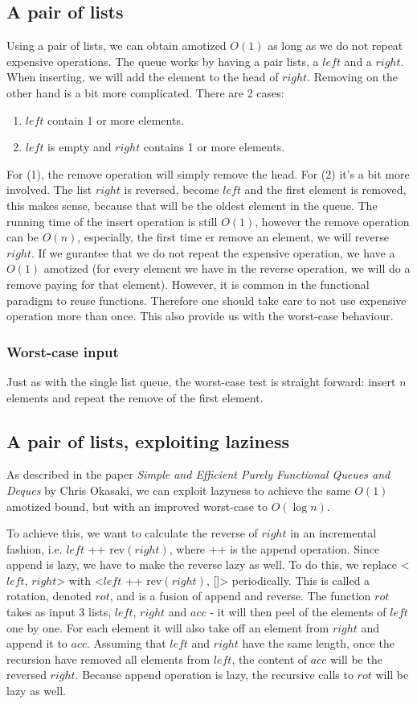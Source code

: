 \subsection*{A pair of lists}
Using a pair of lists, we can obtain amotized $O(1)$ as long as we do not repeat expensive operations. The queue works by having a pair lists, a $left$ and a $right$. When inserting, we will add the element to the head of $right$. Removing on the other hand is a bit more complicated. There are 2 cases:
\begin{enumerate}
	\item $left$ contain 1 or more elements.
	\item $left$ is empty and $right$ contains 1 or more elements.
\end{enumerate}
For (1), the remove operation will simply remove the head. For (2) it's a bit more involved. The list $right$ is reversed, become $left$ and the first element is removed, this makes sense, because that will be the oldest element in the queue. The running time of the insert operation is still $O(1)$, however the remove operation can be $O(n)$, especially, the first time er remove an element, we will reverse $right$. If we gurantee that we do not repeat the expensive operation, we have a $O(1)$ amotized (for every element we have in the reverse operation, we will do a remove paying for that element). However, it is common in the functional paradigm to reuse functions. Therefore one should take care to not use expensive operation more than once. This also provide us with the worst-case behaviour.

\subsubsection{Worst-case input}
Just as with the single list queue, the worst-case test is straight forward: insert $n$ elements and repeat the remove of the first element.

\subsection*{A pair of lists, exploiting laziness}
As described in the paper \textit{Simple and Efficient Purely Functional Queues and Deques} by Chris Okasaki, we can exploit lazyness to achieve the same $O(1)$ amotized bound, but with an improved worst-case to $O(\log n)$.

To achieve this, we want to calculate the reverse of $right$ in an incremental fashion, i.e. $left$ ++ rev$(right)$, where ++ is the append operation. Since append is lazy, we have to make the reverse lazy as well. To do this, we replace <$left$, $right$> with <$left$ ++ rev$(right)$, []> periodically. This is called a rotation, denoted $rot$, and is a fusion of append and reverse. The function $rot$ takes as input 3 lists, $left$, $right$ and $acc$ - it will then peel of the elements of $left$ one by one. For each element it will also take off an element from $right$ and append it to $acc$. Assuming that $left$ and $right$ have the same length, once the recursion have removed all elements from $left$, the content of $acc$ will be the reversed $right$. Because append operation is lazy, the recursive calls to $rot$ will be lazy as well.

